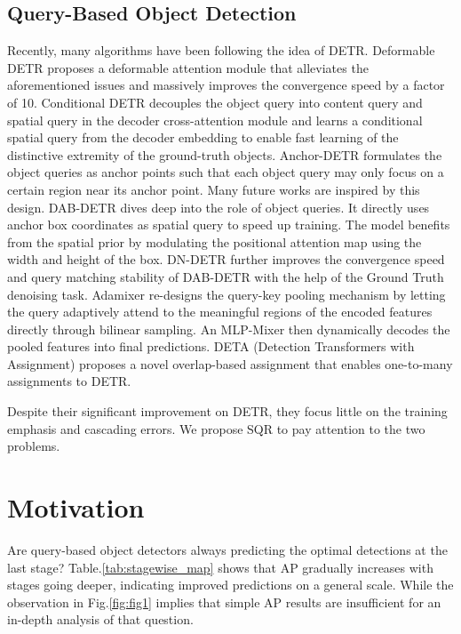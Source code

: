 \documentclass[10pt,twocolumn,letterpaper]{article}
\begin{document}
\subsection{Query-Based Object Detection}
Recently, many algorithms have been following the idea of DETR. Deformable DETR \cite{Zhu2021DeformableDD} proposes a deformable attention module that alleviates the aforementioned issues and massively improves the convergence speed by a factor of 10. 
Conditional DETR \cite{Meng2021ConditionalDF} decouples the object query into content query and spatial query in the decoder cross-attention module and learns a conditional spatial query from the decoder embedding to enable fast learning of the distinctive extremity of the ground-truth objects. 
Anchor-DETR \cite{Wang2022AnchorDQ} formulates the object queries as anchor points such that each object query may only focus on a certain region near its anchor point. Many future works are inspired by this design.
DAB-DETR \cite{Liu2022DABDETRDA} dives deep into the role of object queries. It directly uses anchor box coordinates as spatial query to speed up training. The model benefits from the spatial prior by modulating the positional attention map using the width and height of the box. 
DN-DETR \cite{Li2022DNDETRAD} further improves the convergence speed and query matching stability of DAB-DETR with the help of the Ground Truth denoising task.  
Adamixer \cite{Gao2022AdaMixerAF} re-designs the query-key pooling mechanism by letting the query adaptively attend to the meaningful regions of the encoded features directly through bilinear sampling. An MLP-Mixer then dynamically decodes the pooled features into final predictions. 
DETA (Detection Transformers with Assignment)\cite{NMSback} proposes a novel overlap-based assignment that enables one-to-many assignments to DETR. 


Despite their significant improvement on DETR, they focus little on the training emphasis and cascading errors. We propose SQR to pay attention to the two problems.



\section{Motivation}
\label{sec:motivation}
Are query-based object detectors always predicting the optimal detections at the last stage? Table.\ref{tab:stagewise_map} shows that AP gradually increases with stages going deeper, indicating improved predictions on a general scale. While the observation in Fig.\ref{fig:fig1} implies that simple AP results are insufficient for an in-depth analysis of that question.
\end{document}
